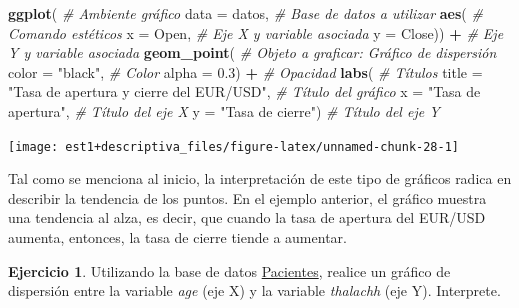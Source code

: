 \documentclass[
  11pt,
]{book}
\newenvironment{Shaded}{\begin{snugshade}}{\end{snugshade}}
\newcommand{\AttributeTok}[1]{\textcolor[rgb]{0.13,0.29,0.53}{#1}}
\newcommand{\CommentTok}[1]{\textcolor[rgb]{0.56,0.35,0.01}{\textit{#1}}}
\newcommand{\FloatTok}[1]{\textcolor[rgb]{0.00,0.00,0.81}{#1}}
\newcommand{\FunctionTok}[1]{\textcolor[rgb]{0.13,0.29,0.53}{\textbf{#1}}}
\newcommand{\NormalTok}[1]{#1}
\newcommand{\SpecialCharTok}[1]{\textcolor[rgb]{0.81,0.36,0.00}{\textbf{#1}}}
\newcommand{\StringTok}[1]{\textcolor[rgb]{0.31,0.60,0.02}{#1}}
\theoremstyle{definition}
\theoremstyle{definition}
\theoremstyle{definition}
\newtheorem{exercise}{Ejercicio}[chapter]
\theoremstyle{definition}
\theoremstyle{remark}
\begin{document}
\begin{Shaded}
\begin{Highlighting}[]
\FunctionTok{ggplot}\NormalTok{( }\CommentTok{\# Ambiente gráfico}
  \AttributeTok{data =}\NormalTok{ datos, }\CommentTok{\# Base de datos a utilizar}
  \FunctionTok{aes}\NormalTok{( }\CommentTok{\# Comando estéticos}
    \AttributeTok{x =}\NormalTok{ Open, }\CommentTok{\# Eje X y variable asociada}
    \AttributeTok{y =}\NormalTok{ Close)) }\SpecialCharTok{+} \CommentTok{\# Eje Y y variable asociada}
  \FunctionTok{geom\_point}\NormalTok{( }\CommentTok{\# Objeto a graficar: Gráfico de dispersión}
    \AttributeTok{color =} \StringTok{"black"}\NormalTok{, }\CommentTok{\# Color}
    \AttributeTok{alpha =} \FloatTok{0.3}\NormalTok{) }\SpecialCharTok{+} \CommentTok{\# Opacidad}
  \FunctionTok{labs}\NormalTok{( }\CommentTok{\# Títulos}
    \AttributeTok{title =} \StringTok{"Tasa de apertura y cierre del EUR/USD"}\NormalTok{, }\CommentTok{\# Título del gráfico}
    \AttributeTok{x =} \StringTok{"Tasa de apertura"}\NormalTok{, }\CommentTok{\# Título del eje X}
    \AttributeTok{y =} \StringTok{"Tasa de cierre"}\NormalTok{) }\CommentTok{\# Título del eje Y}
\end{Highlighting}
\end{Shaded}

\begin{center}\texttt{[image: est1+descriptiva\_files/figure-latex/unnamed-chunk-28-1]} \end{center}

Tal como se menciona al inicio, la interpretación de este tipo de gráficos radica en describir la tendencia de los puntos. En el ejemplo anterior, el gráfico muestra una tendencia al alza, es decir, que cuando la tasa de apertura del EUR/USD aumenta, entonces, la tasa de cierre tiende a aumentar.

\begin{exercise}
Utilizando la base de datos \hyperref[Pacientes]{Pacientes}, realice un gráfico de dispersión entre la variable \emph{age} (eje X) y la variable \emph{thalachh} (eje Y). Interprete.
\end{exercise}
\end{document}
